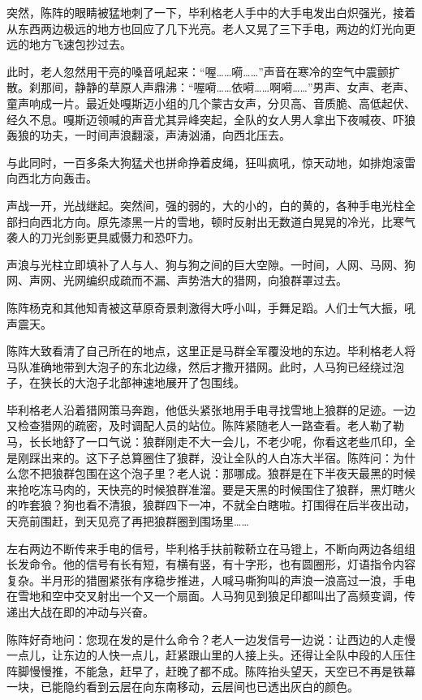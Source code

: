 \par 突然，陈阵的眼睛被猛地刺了一下，毕利格老人手中的大手电发出白炽强光，接着从东西两边极远的地方也回应了几下光亮。老人又晃了三下手电，两边的灯光向更远的地方飞速包抄过去。
\par 此时，老人忽然用干亮的嗓音吼起来：“喔……嗬……”声音在寒冷的空气中震颤扩散。刹那间，静静的草原人声鼎沸：“喔嗬……依嗬……啊嗬……”男声、女声、老声、童声响成一片。最近处嘎斯迈小组的几个蒙古女声，分贝高、音质脆、高低起伏、经久不息。嘎斯迈领喊的声音尤其异峰突起，全队的女人男人拿出下夜喊夜、吓狼轰狼的功夫，一时间声浪翻滚，声涛汹涌，向西北压去。
\par 与此同时，一百多条大狗猛犬也拼命挣着皮绳，狂叫疯吼，惊天动地，如排炮滚雷向西北方向轰击。
\par 声战一开，光战继起。突然间，强的弱的，大的小的，白的黄的，各种手电光柱全部扫向西北方向。原先漆黑一片的雪地，顿时反射出无数道白晃晃的冷光，比寒气袭人的刀光剑影更具威慑力和恐吓力。
\par 声浪与光柱立即填补了人与人、狗与狗之间的巨大空隙。一时间，人网、马网、狗网、声网、光网编织成疏而不漏、声势浩大的猎网，向狼群罩过去。
\par 陈阵杨克和其他知青被这草原奇景刺激得大呼小叫，手舞足蹈。人们士气大振，吼声震天。
\par 陈阵大致看清了自己所在的地点，这里正是马群全军覆没地的东边。毕利格老人将马队准确地带到大泡子的东北边缘，然后才撒开猎网。此时，人马狗已经绕过泡子，在狭长的大泡子北部神速地展开了包围线。
\par 毕利格老人沿着猎网策马奔跑，他低头紧张地用手电寻找雪地上狼群的足迹。一边又检查猎网的疏密，及时调配人员的站位。陈阵紧随老人一路查看。老人勒了勒马，长长地舒了一口气说：狼群刚走不大一会儿，不老少呢，你看这老些爪印，全是刚踩出来的。这下子总算圈住了狼群，没让全队的人白冻大半宿。陈阵问：为什么您不把狼群包围在这个泡子里？老人说：那哪成。狼群是在下半夜天最黑的时候来抢吃冻马肉的，天快亮的时候狼群准溜。要是天黑的时候围住了狼群，黑灯瞎火的咋套狼？狗也看不清狼，狼群四下一冲，不就全白瞎啦。打围得在后半夜出动，天亮前围赶，到天见亮了再把狼群圈到围场里……
\par 左右两边不断传来手电的信号，毕利格手扶前鞍鞒立在马镫上，不断向两边各组组长发命令。他的信号有长有短，有横有竖，有十字形，也有圆圈形，灯语指令内容复杂。半月形的猎圈紧张有序稳步推进，人喊马嘶狗叫的声浪一浪高过一浪，手电在雪地和空中交叉射出一个又一个扇面。人马狗见到狼足印都叫出了高频变调，传递出大战在即的冲动与兴奋。
\par 陈阵好奇地问：您现在发的是什么命令？老人一边发信号一边说：让西边的人走慢一点儿，让东边的人快一点儿，赶紧跟山里的人接上头。还得让全队中段的人压住阵脚慢慢推，不能急，赶早了，赶晚了都不成。陈阵抬头望天，天空已不再是铁幕一块，已能隐约看到云层在向东南移动，云层间也已透出灰白的颜色。
